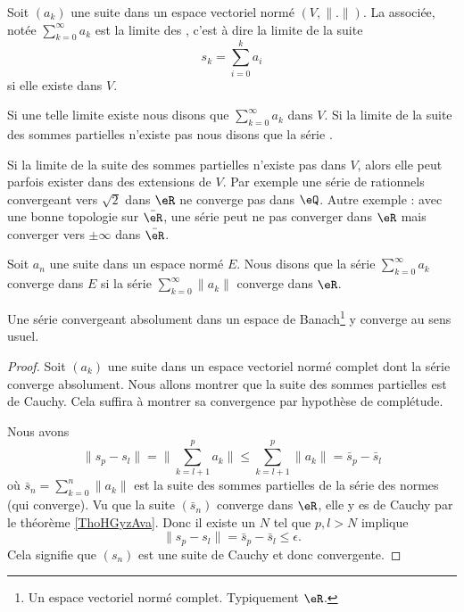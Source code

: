 \begin{definition}\label{DefGFHAaOL}
Soit \( (a_k)\) une suite dans un espace vectoriel normé \( (V,\| . \| )\). La  associée, notée \( \sum_{k=0}^{\infty}a_k\) est la limite des , c'est à dire la limite de la suite
    \begin{equation}
        s_k=\sum_{i=0}^ka_i
    \end{equation}
    si elle existe dans \( V\).

    Si une telle limite existe nous disons que \( \sum_{k=0}^{\infty}a_k\)  dans \( V\). Si la limite de la suite des sommes partielles n'existe pas nous disons que la série .
\end{definition}
\begin{remark}
    Si la limite de la suite des sommes partielles n'existe pas dans \( V\), alors elle peut parfois exister dans des extensions de \( V\). Par exemple une série de rationnels convergeant vers \( \sqrt{2}\) dans \( \eR\) ne converge pas dans \( \eQ\). Autre exemple : avec une bonne topologie sur \( \bar \eR\), une série peut ne pas converger dans \( \eR\) mais converger vers \( \pm\infty\) dans \( \bar \eR\).
\end{remark}

\begin{definition} \label{DefDOaqApF}
    Soit \( a_n\) une suite dans un espace normé \( E\). Nous disons que la série \( \sum_{k=0}^{\infty}a_k\) converge  dans \( E\) si la série \( \sum_{k=0}^{\infty}\| a_k \|\) converge dans \( \eR\).
\end{definition}

\begin{proposition} \label{PropAKCusNM}
    Une série convergeant absolument dans un espace de Banach\footnote{Un espace vectoriel normé complet. Typiquement \( \eR\).} y converge au sens usuel.
\end{proposition}

\begin{proof}
    Soit \( (a_k)\) une suite dans un espace vectoriel normé complet dont la série converge absolument. Nous allons montrer que la suite des sommes partielles est de Cauchy. Cela suffira à montrer sa convergence par hypothèse de complétude.

    Nous avons
    \begin{equation}
        \| s_p-s_l \|=\| \sum_{k=l+1}^{p}a_k\|  \leq\sum_{k=l+1}^p\| a_k \|=\bar s_p-\bar s_l
    \end{equation}
    où \( \bar s_n=\sum_{k=0}^n \| a_k \|\) est la suite des sommes partielles de la série des normes (qui converge). Vu que la suite \( (\bar s_n)\) converge dans \( \eR\), elle y es de Cauchy par le théorème \ref{ThoHGyzAva}. Donc il existe un \( N\) tel que \( p,l>N\) implique
    \begin{equation}
        \| s_p-s_l \|=\bar s_p-\bar s_l\leq \epsilon.
    \end{equation}
    Cela signifie que \( (s_n)\) est une suite de Cauchy et donc convergente.
\end{proof}

